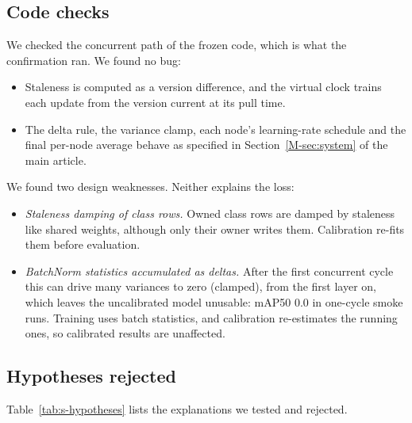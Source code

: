 \documentclass[pdflatex,sn-mathphys-num]{sn-jnl}
\begin{document}
\subsection{Code checks}
We checked the concurrent path of the frozen code, which is what the confirmation ran. We found no bug:
\begin{itemize}
\item Staleness is computed as a version difference, and the virtual clock trains each update from the version current at its pull time.
\item The delta rule, the variance clamp, each node's learning-rate schedule and the final per-node average behave as specified in Section~\ref{M-sec:system} of the main article.
\end{itemize}
We found two design weaknesses. Neither explains the loss:
\begin{itemize}
\item \emph{Staleness damping of class rows.} Owned class rows are damped by staleness like shared weights, although only their owner writes them. Calibration re-fits them before evaluation.
\item \emph{BatchNorm statistics accumulated as deltas.} After the first concurrent cycle this can drive many variances to zero (clamped), from the first layer on, which leaves the uncalibrated model unusable: mAP50 0.0 in one-cycle smoke runs. Training uses batch statistics, and calibration re-estimates the running ones, so calibrated results are unaffected.
\end{itemize}

\subsection{Hypotheses rejected}
Table~\ref{tab:s-hypotheses} lists the explanations we tested and rejected.
\end{document}
